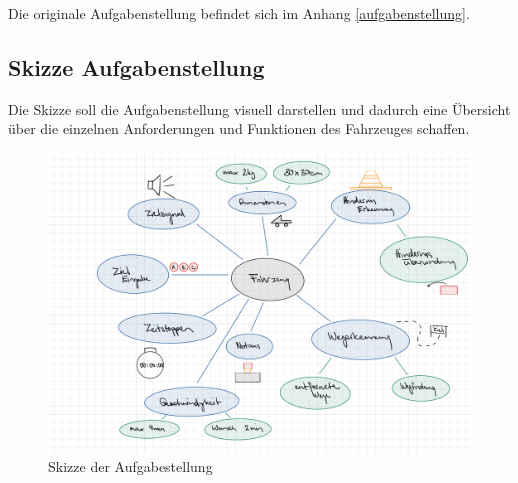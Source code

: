 \documentclass[../main.tex]{subfiles}
\begin{document}
Die originale Aufgabenstellung befindet sich im Anhang \ref{aufgabenstellung}.

\newpage
\subsection{Skizze Aufgabenstellung}
Die Skizze soll die Aufgabenstellung visuell darstellen und dadurch eine  Übersicht über die einzelnen Anforderungen und Funktionen des Fahrzeuges schaffen.
    \begin{figure}[H]
        \includegraphics[width=\textwidth]{assets/Skizze_Aufgabenstellung.pdf}
        \caption{Skizze der Aufgabestellung}
        \label{img:Skizze_Aufgabenstellung}
    \end{figure} 
 
\end{document}
